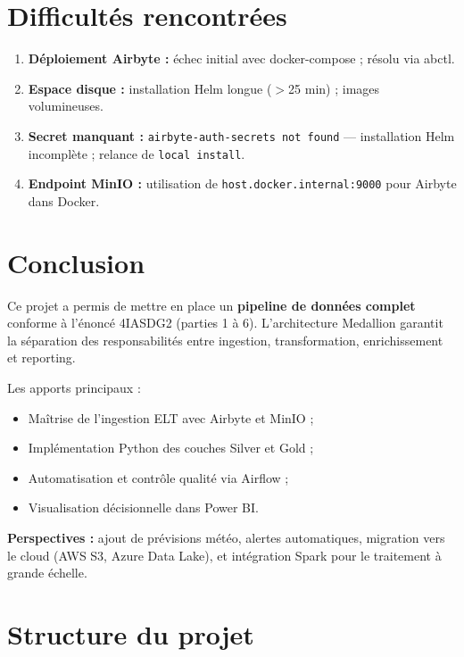 \documentclass[12pt,a4paper]{report}
\begin{document}
\chapter{Difficultés rencontrées}

\begin{enumerate}[leftmargin=1.5cm]
    \item \textbf{Déploiement Airbyte :} échec initial avec docker-compose ; résolu via abctl.
    \item \textbf{Espace disque :} installation Helm longue ($>$25 min) ; images volumineuses.
    \item \textbf{Secret manquant :} \texttt{airbyte-auth-secrets not found} — installation Helm incomplète ; relance de \texttt{local install}.
    \item \textbf{Endpoint MinIO :} utilisation de \texttt{host.docker.internal:9000} pour Airbyte dans Docker.
\end{enumerate}

\chapter{Conclusion}

Ce projet a permis de mettre en place un \textbf{pipeline de données complet} conforme à l'énoncé 4IASDG2 (parties 1 à 6). L'architecture Medallion garantit la séparation des responsabilités entre ingestion, transformation, enrichissement et reporting.

Les apports principaux :
\begin{itemize}[leftmargin=1.5cm]
    \item Maîtrise de l'ingestion ELT avec Airbyte et MinIO ;
    \item Implémentation Python des couches Silver et Gold ;
    \item Automatisation et contrôle qualité via Airflow ;
    \item Visualisation décisionnelle dans Power BI.
\end{itemize}

\textbf{Perspectives :} ajout de prévisions météo, alertes automatiques, migration vers le cloud (AWS S3, Azure Data Lake), et intégration Spark pour le traitement à grande échelle.

\appendix

\chapter{Structure du projet}
\end{document}
